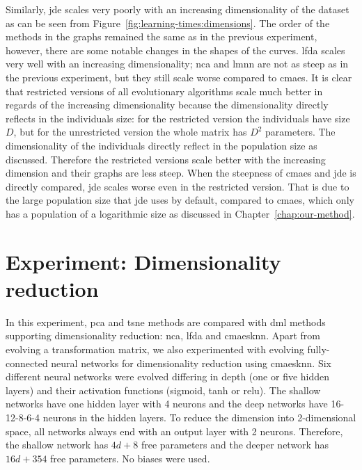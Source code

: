 \documentclass[12pt,a4paper]{report}
\begin{document}
Similarly, \ac{jde} scales very poorly with an increasing dimensionality of the dataset as can be seen from Figure~\ref{fig:learning-times:dimensions}. The order of the methods in the graphs remained the same as in the previous experiment, however, there are some notable changes in the shapes of the curves. \ac{lfda} scales very well with an increasing dimensionality; \ac{nca} and \ac{lmnn} are not as steep as in the previous experiment, but they still scale worse compared to \ac{cmaes}. It is clear that restricted versions of all evolutionary algorithms scale much better in regards of the increasing dimensionality because the dimensionality directly reflects in the individuals size: for the restricted version the individuals have size $D$, but for the unrestricted version the whole matrix has $D^2$ parameters. The dimensionality of the individuals directly reflect in the population size as discussed. Therefore the restricted versions scale better with the increasing dimension and their graphs are less steep. When the steepness of \ac{cmaes} and \ac{jde} is directly compared, \ac{jde} scales worse even in the restricted version. That is due to the large population size that \ac{jde} uses by default, compared to \ac{cmaes}, which only has a population of a logarithmic size as discussed in Chapter~\ref{chap:our-method}.



\section{Experiment: Dimensionality reduction} \label{chap:exp:dimred}


In this experiment, \ac{pca} and \ac{tsne} methods are compared with \ac{dml} methods supporting dimensionality reduction: \ac{nca}, \ac{lfda} and \ac{cmaesknn}. Apart from evolving a transformation matrix, we also experimented with evolving fully-connected neural networks for dimensionality reduction using \ac{cmaesknn}. Six different neural networks were evolved differing in depth (one or five hidden layers) and their activation functions (sigmoid, \ac{tanh} or \ac{relu}). The shallow networks have one hidden layer with 4 neurons and the deep networks have 16-12-8-6-4 neurons in the hidden layers. To reduce the dimension into 2-dimensional space, all networks always end with an output layer with 2 neurons. Therefore, the shallow network has $4d+8$ free parameters and the deeper network has $16d+354$ free parameters. No biases were used.
\end{document}
